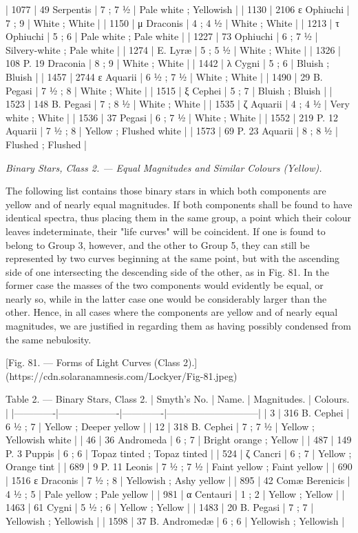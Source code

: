 \documentclass[a4paper, 12pt, oneside, polutonikogreek, english]{article}
\begin{document}
| 1077    | 49 Serpentis      | 7 ; 7 ½   | Pale white ; Yellowish     |
| 1130    | 2106 ε Ophiuchi    | 7 ; 9    | White ; White          |
| 1150    | μ Draconis       | 4 ; 4 ½   | White ; White          |
| 1213    | τ Ophiuchi       | 5 ; 6    | Pale white ; Pale white     |
| 1227    | 73 Ophiuchi      | 6 ; 7 ½   | Silvery-white ; Pale white   |
| 1274    | E. Lyræ        | 5 ; 5 ½   | White ; White          |
| 1326    | 108 P. 19 Draconia   | 8 ; 9    | White ; White          |
| 1442    | λ Cygni        | 5 ; 6    | Bluish ; Bluish         |
| 1457    | 2744 ε Aquarii     | 6 ½ ; 7 ½  | White ; White          |
| 1490    | 29 B. Pegasi      | 7 ½ ; 8   | White ; White          |
| 1515    | ξ Cephei        | 5 ; 7    | Bluish ; Bluish         |
| 1523    | 148 B. Pegasi     | 7 ; 8 ½   | White ; White          |
| 1535    | ζ Aquarii       | 4 ; 4 ½   | Very white ; White       |
| 1536    | 37 Pegasi       | 6 ; 7 ½   | White ; White          |
| 1552    | 219 P. 12 Aquarii   | 7 ½ ; 8   | Yellow ; Flushed white     |
| 1573    | 69 P. 23 Aquarii    | 8 ; 8 ½   | Flushed ; Flushed        |

\emph{Binary Stars, Class 2. --- Equal Magnitudes and Similar Colours (Yellow).}

The following list contains those binary stars in which both components are yellow and of nearly equal magnitudes. If both components shall be found to have identical spectra, thus placing them in the same group, a point which their colour leaves indeterminate, their "life curves" will be coincident. If one is found to belong to Group 3, however, and the other to Group 5, they can still be represented by two curves beginning at the same point, but with the ascending side of one intersecting the descending side of the other, as in Fig. 81. In the former case the masses of the two components would evidently be equal, or nearly so, while in the latter case one would be considerably larger than the other. Hence, in all cases where the components are yellow and of nearly equal magnitudes, we are justified in regarding them as having possibly condensed from the same nebulosity.

[Fig. 81. --- Forms of Light Curves (Class 2).](https://cdn.solaranamnesis.com/Lockyer/Fig-81.jpeg)

Table 2. --- Binary Stars, Class 2. 
| Smyth’s No. | Name.       | Magnitudes. | Colours.          |
|-------------|-------------------|-------------|-----------------------------|
| 3      | 316 B. Cephei   | 6 ½ ; 7   | Yellow ; Deeper yellow   |
| 12     | 318 B. Cephei   | 7 ; 7 ½   | Yellow ; Yellowish white  |
| 46     | 36 Andromeda   | 6 ; 7    | Bright orange ; Yellow   |
| 487     | 149 P. 3 Puppis  | 6 ; 6    | Topaz tinted ; Topaz tinted |
| 524     | ζ Cancri     | 6 ; 7    | Yellow ; Orange tint    |
| 689     | 9 P. 11 Leonis  | 7 ½ ; 7 ½  | Faint yellow ; Faint yellow |
| 690     | 1516 ε Draconis  | 7 ½ ; 8   | Yellowish ; Ashy yellow   |
| 895     | 42 Comæ Berenicis | 4 ½ ; 5   | Pale yellow ; Pale yellow  |
| 981     | α Centauri    | 1 ; 2    | Yellow ; Yellow       |
| 1463    | 61 Cygni     | 5 ½ ; 6   | Yellow ; Yellow       |
| 1483    | 20 B. Pegasi   | 7 ; 7    | Yellowish ; Yellowish    |
| 1598    | 37 B. Andromedæ  | 6 ; 6    | Yellowish ; Yellowish    |
\end{document}
